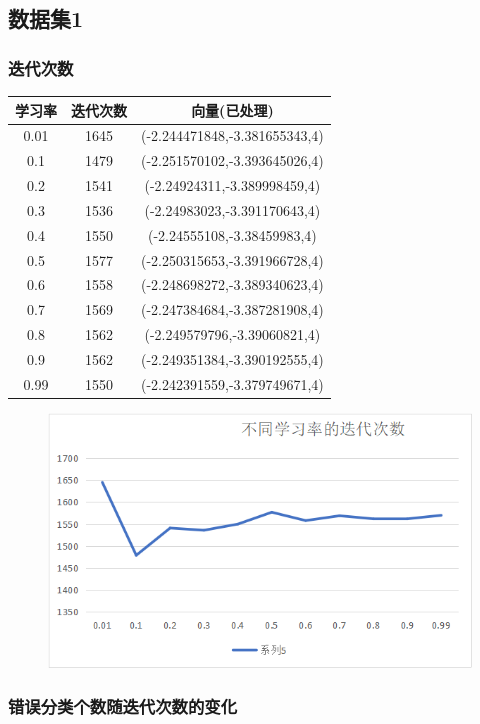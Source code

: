 \documentclass[10pt,a4paper]{ctexart}
\begin{document}
\subsection{数据集1}
\subsubsection*{迭代次数}
\begin{longtable}{|c|c|c|}
	\hline 学习率&迭代次数&向量(已处理)\\
	\hline 0.01&1645&(-2.244471848,-3.381655343,4)\\
	\hline 0.1&1479&(-2.251570102,-3.393645026,4)\\
	\hline 0.2&1541&(-2.24924311,-3.389998459,4)\\
	\hline 0.3&1536&(-2.24983023,-3.391170643,4)\\
	\hline 0.4&1550&(-2.24555108,-3.38459983,4)\\
	\hline 0.5&1577&(-2.250315653,-3.391966728,4)\\
	\hline 0.6&1558&(-2.248698272,-3.389340623,4)\\
	\hline 0.7&1569&(-2.247384684,-3.387281908,4)\\
	\hline 0.8&1562&(-2.249579796,-3.39060821,4)\\
	\hline 0.9&1562&(-2.249351384,-3.390192555,4)\\
	\hline 0.99&1550&(-2.242391559,-3.379749671,4)\\
	\hline 
	\end{longtable}
\begin{figure}[htbp]
  \centering
  \includegraphics[width=1\textwidth]{迭代次数.png}
\end{figure}
  \subsubsection*{错误分类个数随迭代次数的变化}
  
\end{document}

